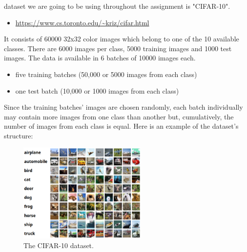  dataset we are going to be using throughout the assignment is "CIFAR-10".
\begin{itemize}
  \item \url{https://www.cs.toronto.edu/~kriz/cifar.html}
\end{itemize}

It consists of 60000 32x32 color images which belong to one of the 10 available classes. There are 
6000 images per class, 5000 training images and 1000 test images. The data is available in 6 batches of 
10000 images each.
\begin{itemize}
  \item five training batches (50,000 or 5000 images from each class)
  \item one test batch (10,000 or 1000 images from each class)
\end{itemize}
Since the training batches' images are chosen randomly, each batch individually may contain more images 
from one class than another but, cumulatively, the number of images from each class is equal. 
Here is an example of the dataset's structure:

\begin{figure}[H]
  \centering
  \includegraphics[width=2.5in]{media/cifar10_example.png}
  \caption{The CIFAR-10 dataset.}
  \label{CIFAR example}
\end{figure}